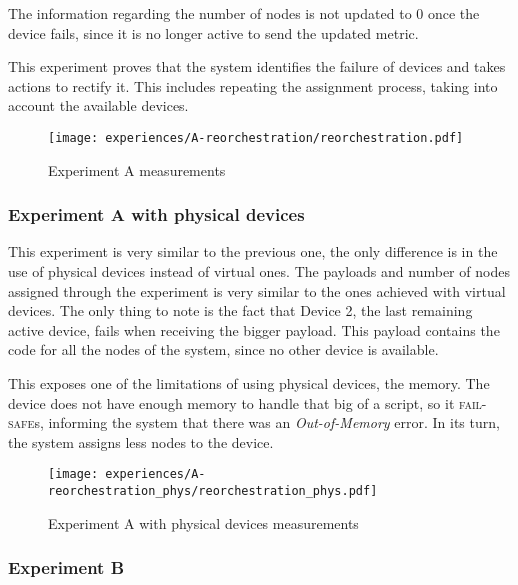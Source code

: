 The information regarding the number of nodes is not updated to 0 once the device fails, since it is no longer active to send the updated metric. 

This experiment proves that the system identifies the failure of devices and takes actions to rectify it. This includes repeating the assignment process, taking into account the available devices.

\begin{figure}[h]
\centering
\texttt{[image: experiences/A-reorchestration/reorchestration.pdf]}
\caption[Experiment A measurements]{Experiment A measurements}\label{fig:experiment_a_graph}
\end{figure}


\subsubsection{Experiment A with physical devices}

This experiment is very similar to the previous one, the only difference is in the use of physical devices instead of virtual ones. The payloads and number of nodes assigned through the experiment is very similar to the ones achieved with virtual devices. The only thing to note is the fact that Device 2, the  last remaining active device, fails when receiving the bigger payload. This payload contains the code for all the nodes of the system, since no other device is available. 

This exposes one of the limitations of using physical devices, the memory. The device does not have enough memory to handle that big of a script, so it \textsc{fail-safe}s, informing the system that there was an \textit{Out-of-Memory} error. In its turn, the system assigns less nodes to the device.

\begin{figure}[h]
\centering
\texttt{[image: experiences/A-reorchestration\_phys/reorchestration\_phys.pdf]}
\caption[Experiment A with physical devices measurements]{Experiment A with physical devices measurements}\label{fig:experiment_a_phys_graph}
\end{figure}


\subsubsection{Experiment B}

